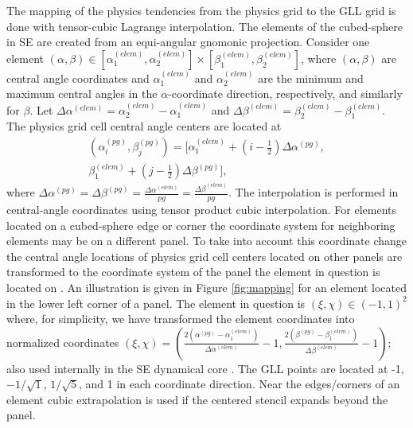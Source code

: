 \documentclass[twocol]{ametsoc}
\begin{document}
%
\appendix
The mapping of the physics tendencies from the physics grid to the GLL grid is done with tensor-cubic Lagrange interpolation. The elements of the cubed-sphere in SE are created from an equi-angular gnomonic projection. Consider one element $(\alpha,\beta) \in \left[ \alpha^{(elem)}_1,\alpha^{(elem)}_2 \right]\times \left[ \beta^{(elem)}_1,\beta^{(elem)}_2\right]$, where $(\alpha,\beta)$ are central angle coordinates and $\alpha^{(elem)}_1$ and $\alpha^{(elem)}_2$ are the minimum and maximum central angles in the $\alpha$-coordinate direction, respectively, and similarly for $\beta$. Let $\Delta \alpha^{(elem)}=\alpha^{(elem)}_2-\alpha^{(elem)}_1$ and $\Delta \beta^{(elem)}=\beta^{(elem)}_2-\beta^{(elem)}_1$. The physics grid cell central angle centers are located at
\begin{multline}
(\alpha^{(pg)}_i,\beta^{(pg)}_j)= \Big[ \alpha^{(elem)}_1+\left(i-\tfrac{1}{2}\right) \Delta \alpha^{(pg)},\\
                                      \beta^{(elem)}_1+\left(j-\tfrac{1}{2}\right) \Delta \beta^{(pg)}\Big],
\end{multline}
where $\Delta \alpha^{(pg)}=\Delta \beta^{(pg)}=\frac{\Delta \alpha^{(elem)}}{pg}=\frac{\Delta \beta^{(elem)}}{pg}$. The interpolation is performed in central-angle coordinates using tensor product cubic interpolation. For elements located on a cubed-sphere edge or corner the coordinate system for neighboring elements may be on a different panel. To take into account this coordinate change the central angle locations of physics grid cell centers located on other panels are transformed to the coordinate system of the panel the element in question is located on \cite[the transformations are given in, e.g.,  ][]{NTL2005MWRb}. An illustration is given in Figure \ref{fig:mapping} for an element located in the lower left corner of a panel. The element in question is $(\xi,\chi)\in (-1,1)^2$ where, for simplicity, we have transformed the element coordinates into normalized coordinates $(\xi,\chi) = \left( \frac{ 2\left(\alpha^{(pg)}-\alpha^{(elem)}_1\right)}{\Delta \alpha^{(elem)}}-1,\frac{2\left( \beta^{(pg)}-\beta^{(elem)}_1\right)}{\Delta \beta^{(elem)}}-1\right)$; also used internally in the SE dynamical core \citep[see, e.g., section 3.3 in ][]{LetAl2018JAMES}. The GLL points are located at -1,$-1/\sqrt{1}$, $1/\sqrt{5}$, and 1 in each coordinate direction. Near the edges/corners of an element cubic extrapolation is used if the centered stencil expands beyond the panel.
\end{document}
